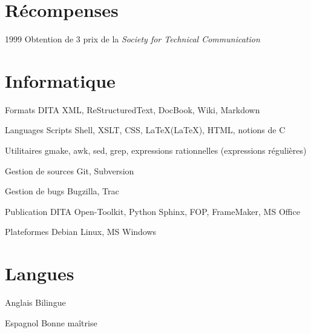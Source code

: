 \documentclass[12pt,a4paper,roman]{moderncv}
\begin{document}

\section{Récompenses}

\cvitem
    {1999}
    {Obtention de 3 prix de la \textit{Society for Technical Communication}}


\section{Informatique}

\cvitem
    {Formats}
    {DITA XML, ReStructuredText, DocBook, Wiki, Markdown}

\cvitem
    {Languages}
    {Scripts Shell, XSLT, CSS, \LaTeX (LaTeX), HTML, notions de C}

\cvitem
    {Utilitaires}
    {gmake, awk, sed, grep, expressions rationnelles (expressions régulières)}

\cvitem
    {Gestion de sources}
    {Git, Subversion}

\cvitem
    {Gestion de bugs}
    {Bugzilla, Trac}

\cvitem
    {Publication}
    {DITA Open-Toolkit, Python Sphinx, FOP, FrameMaker, MS Office}

\cvitem
    {Plateformes}
    {Debian Linux, MS Windows}

\section{Langues}

\cvitem
    {Anglais}
    {Bilingue}

\cvitem
    {Espagnol}
    {Bonne maîtrise}

\end{document}
